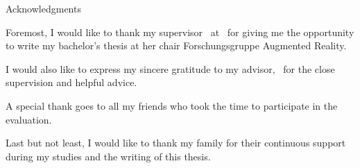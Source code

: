 \thispagestyle{empty}

\vspace*{20mm}

\begin{center}
{ Acknowledgments}
\end{center}

\vspace{10mm}

Foremost, I would like to thank my supervisor \getSupervisor\ at \getUniversity\ for giving me the opportunity to write my bachelor's thesis at her chair Forschungsgruppe Augmented Reality.

I would also like to express my sincere gratitude to my advisor, \getAdvisor\ for the close supervision and helpful advice.

A special thank goes to all my friends who took the time to participate in the evaluation.

Last but not least, I would like to thank my family for their continuous support during my studies and the writing of this thesis.

\cleardoublepage{}
